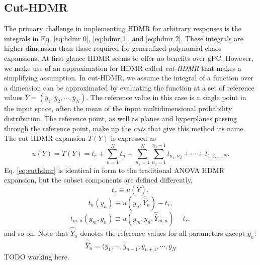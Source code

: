 \subsection{Cut-HDMR}
The primary challenge in implementing HDMR for arbitrary responses is the integrals in Eq. \ref{eq:hdmr 0},
\ref{eq:hdmr 1}, and \ref{eq:hdmr 2}.  These integrals are higher-dimension than those required for
generalized polynomial chaos expansions.  At first glance HDMR seems to offer no benefits over gPC.  However,
we make use of an approximation for HDMR called \emph{cut-HDMR} \cite{cutHDMR} that makes a simplifying assumption.
In cut-HDMR, we assume the integral of a function over a dimension can be approximated by evaluating the
function at a set of reference values $\bar Y = (\bar y_1,\bar y_2,\cdots,\bar y_N)$.  The reference value in this case
is a single point in the input space, often the mean of the input multidimensional probability distribution.  The
reference point, as well as planes and hyperplanes passing through the reference point, make up the
\emph{cuts} that give this method its name.  The cut-HDMR expansion $T(Y)$ is expressed as
\begin{equation}\label{eq:cuthdmr}
  u(Y) = T(Y) = t_r + \sum_{n=1}^N t_n + \sum_{n_1=1}^N \sum_{n_2=1}^{n_1-1}
  t_{n_1,n_2}+\cdots+t_{1,2,\ldots,N}.
\end{equation}
Eq. \ref{eq:cuthdmr} is identical in form to the traditional ANOVA HDMR expansion, but the subset components
are defined differently,
\begin{equation}
  t_r \equiv u(\bar Y),
\end{equation}
\begin{equation}
  t_n(y_n) \equiv u(y_n,\hat\bar Y_n) - t_r,
\end{equation}
\begin{equation}
  t_{m,n}(y_m,y_n) \equiv u(y_m,y_n,\hat\bar Y_{m,n}) - t_r,
\end{equation}
and so on. Note that $\hat\bar Y_n$ denotes the reference values for all parameters except $y_n$:
\begin{equation}
  \hat\bar Y_n = (\bar y_1,\cdots,\bar y_{n-1},\bar y_{n+1},\cdots,\bar y_N
\end{equation}
TODO working here.


